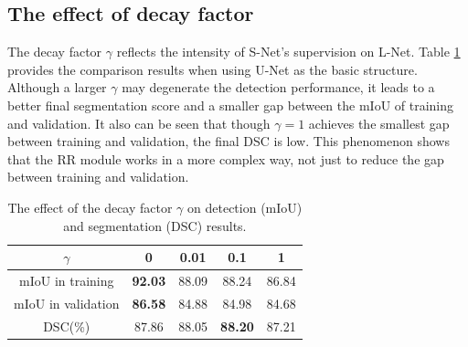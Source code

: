 \documentclass{article}
\begin{document}
\subsection{The effect of decay factor }
\vspace{-5pt}
The decay factor $\gamma$ reflects the intensity of S-Net's supervision on L-Net. 
Table \ref{tab:gil} provides the comparison results when using U-Net as the basic structure. 
Although a larger $\gamma$ may degenerate the detection performance, it leads to a better final segmentation score and a smaller gap between the mIoU of training and validation. 
It also can be seen that though $\gamma=1$ achieves the smallest gap between training and validation, the final DSC is low. This phenomenon shows that the RR module works in a more complex way, not just to reduce the gap between training and validation. \par
\begin{table}[ht]
\centering \vspace{-8pt}
\caption{The effect of the decay factor $\gamma$ on detection (mIoU) and segmentation (DSC) results. %
}
\label{tab:gil}\vspace{-10pt}
\setlength{\tabcolsep}{2mm}
\begin{tabular}{ccccc}  
\hline\noalign{\smallskip}
{$\gamma$}    & 0 & 0.01 & 0.1 & 1\\
\hline
mIoU in training & \textbf{92.03} & 88.09 & 88.24 & 86.84\\
mIoU in validation & \textbf{86.58} & 84.88 & 84.98 & 84.68 \\
DSC(\%) & 87.86 & 88.05 & \textbf{88.20} & 87.21 \\
\hline
\end{tabular}
\end{table}


\end{document}
